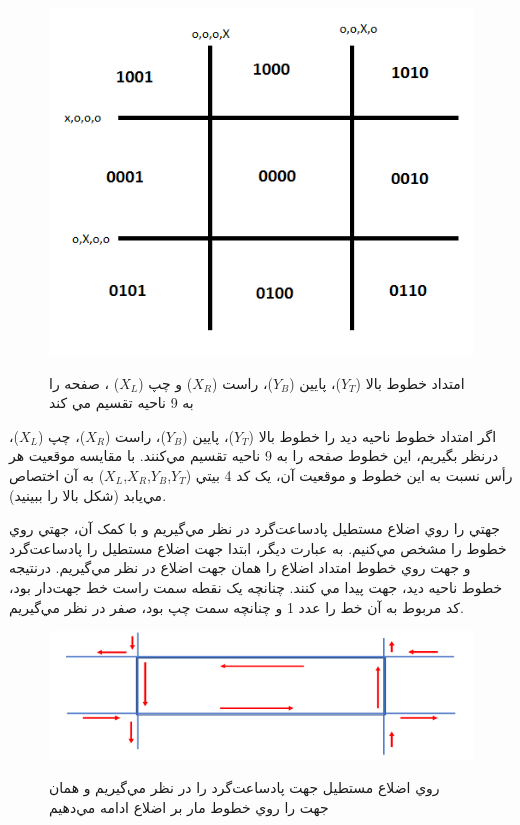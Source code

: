 \documentclass{book}
\begin{document}
\begin{figure}[h!]
    \begin{center}
        \includegraphics[width=\linewidth]{partition.jpg}
        \label{partition2}
        \caption{ امتداد خطوط بالا ($Y_T$)، پايين ($Y_B$)، راست ($X_R$) و چپ ($X_L$) ، صفحه را به 9 ناحيه تقسيم مي کند }
    \end{center}
\end{figure}

اگر امتداد خطوط ناحيه ديد را خطوط بالا ($Y_T$)، پايين ($Y_B$)، راست ($X_R$)، چپ ($X_L$)، درنظر بگيريم، اين خطوط صفحه را به 9 ناحيه تقسيم مي‌کنند. با مقايسه موقعيت هر رأس نسبت به اين خطوط و موقعيت آن، يک کد 4 بيتي ($Y_T$,$Y_B$,$X_R$,$X_L$)  به آن اختصاص مي‌يابد (شکل بالا را ببينيد).

جهتي را روي اضلاع مستطيل پادساعت‌گرد در نظر مي‌گيريم و با کمک آن، جهتي روي خطوط را مشخص مي‌کنيم. به عبارت ديگر، ابتدا جهت اضلاع مستطيل را پادساعت‌گرد و جهت روي خطوط امتداد اضلاع را همان جهت اضلاع در نظر مي‌گيريم. درنتيجه خطوط ناحيه ديد، جهت پيدا مي کنند. چنانچه يک نقطه سمت راست خط جهت‌دار بود، کد مربوط به آن خط را عدد 1 و چنانچه سمت چپ بود، صفر در نظر مي‌گيريم. 

\begin{figure}[h!]
    \begin{center}
        \includegraphics[width=\linewidth]{rec_par.png}
        \label{rec_par}
        \caption{روي اضلاع مستطيل جهت پادساعت‌گرد را در نظر مي‌گيريم و همان جهت را روي خطوط مار بر اضلاع ادامه مي‌دهيم}
    \end{center}
\end{figure}
\end{document}

